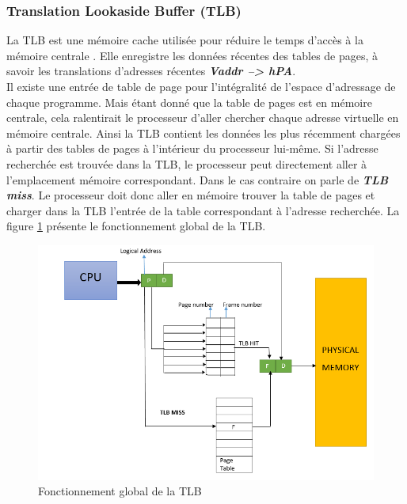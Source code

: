 \subsubsection{Translation Lookaside Buffer (TLB)}
La TLB est une mémoire cache utilisée pour réduire le temps d'accès à la mémoire centrale \cite{article7, book2}. Elle enregistre les données récentes des tables de pages, à savoir les translations d'adresses récentes \textit{\textbf{\acs{Vaddr} --> hPA}}.\\
Il existe une entrée de table de page pour l'intégralité de l'espace d'adressage de chaque programme. Mais étant donné que la table de pages est en mémoire centrale, cela ralentirait le processeur d'aller chercher chaque adresse virtuelle en mémoire centrale. Ainsi la TLB contient les données les plus récemment chargées à partir des tables de pages à l'intérieur du processeur lui-même. Si l'adresse recherchée est trouvée dans la TLB, le processeur peut directement aller à l'emplacement mémoire correspondant. Dans le cas contraire on parle de \textit{\textbf{TLB miss}}. Le processeur doit donc aller en mémoire trouver la table de pages et charger dans la TLB l'entrée de la table correspondant à l'adresse recherchée. La figure \ref{fig:tlb} présente le fonctionnement global de la TLB.
\begin{figure}[htp]
    \centering
    \includegraphics[scale=.7]{chapters/1/fig1/tlb}
    \caption{Fonctionnement global de la TLB}
    \label{fig:tlb}
\end{figure}

